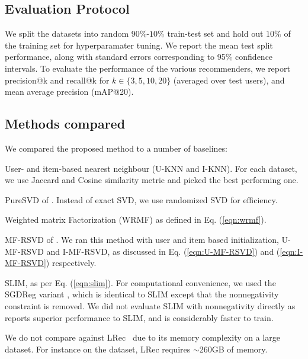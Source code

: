\subsection{Evaluation Protocol}
We split the datasets into random $90\%$-$10\%$ train-test set and hold out $10\%$ of the training set for hyperparamater tuning. We report the mean test split performance, along with standard errors corresponding to 95\% confidence intervals.
To evaluate the performance of the various recommenders, we report \textsf{precision@k} and \textsf{recall@k} for $k \in \{ 3, 5, 10, 20 \}$ (averaged over test users), and mean average precision (mAP@20).


\subsection{Methods compared}

We compared the proposed method to a number of baselines:
\begin{compactitem}

	\item User- and item-based nearest neighbour (U-KNN and I-KNN). For each dataset, we use Jaccard and Cosine similarity metric and  picked the best performing one.

	\item PureSVD of \citet{Cremonesi:2010}. Instead of exact SVD, we use randomized SVD for efficiency.
	
	\item Weighted matrix Factorization (WRMF) as defined in Eq. (\ref{eqn:wrmf}).

	\item MF-RSVD of \citet{Tang:2013}.  We ran this method with user and item based initialization, U-MF-RSVD  and I-MF-RSVD, as discussed in Eq. (\ref{eqn:U-MF-RSVD}) and (\ref{eqn:I-MF-RSVD}) respectively.
	\item SLIM, as per Eq. (\ref{eqn:slim}). For computational convenience, we used the SGDReg variant \citep{Levy:2013}, which is identical to SLIM  except that the nonnegativity constraint is removed. We did not evaluate SLIM with nonnegativity directly as~\citet{Levy:2013} reports superior performance to SLIM, and is considerably faster to train.
\end{compactitem}
We do not compare against LRec~\citep{Sedhain:2016} due to its memory complexity on a large dataset. For instance on the \Lowes dataset, LRec requires $\sim$260GB of memory. 
